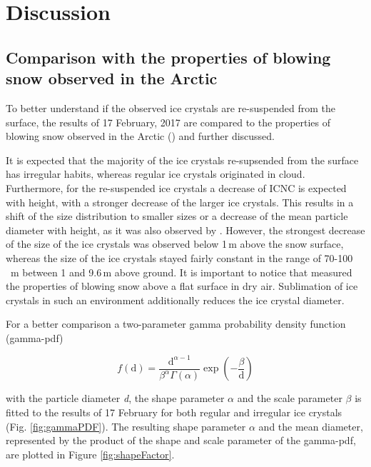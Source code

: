 \documentclass[draft,linenumbers]{agujournal}
\begin{document}
\section{Discussion}
\label{Discussion}

\subsection{Comparison with the properties of blowing snow observed in the Arctic}
\label{Discussion_comp} 
To better understand if the observed ice crystals are re-suspended from the surface, the results of 17 February, 2017 are compared to the properties of blowing snow observed in the Arctic (\citep{Nis05}) and further discussed. 

It is expected that the majority of the ice crystals re-supsended from the surface has irregular habits, whereas regular ice crystals originated in cloud. Furthermore, for the re-suspended ice crystals a decrease of ICNC is expected with height, with a stronger decrease of the larger ice crystals. This results in a shift of the size distribution to smaller sizes or a decrease of the mean particle diameter with height, as it was also observed by \citet{Nis05}. However, the strongest decrease of the size of the ice crystals was observed below 1\,\si{m} above the snow surface, whereas the size of the ice crystals stayed fairly constant in the range of 70-100\,\si{\mu m} between 1 and 9.6\,\si{m} above ground. It is important to notice that \citet{Nis05} measured the properties of blowing snow above a flat surface in dry air. Sublimation of ice crystals in such an environment additionally reduces the ice crystal diameter. 

For a better comparison a two-parameter gamma probability density function (gamma-pdf) \citep{Bud66, Sch82} 

\begin{linenomath*}
\begin{equation}
f(\text{d}) = \frac{\text{d}^{\alpha - 1}}{\beta^{\alpha} \Gamma\left(\alpha\right)}\exp\left(-\frac{\beta}{\text{d}}\right) 
\end{equation}
\end{linenomath*}

with the particle diameter \textit{d}, the shape parameter $\alpha$ and the scale parameter $\beta$ is fitted to the results of 17 February for both regular and irregular ice crystals (Fig. \ref{fig:gammaPDF}). The resulting shape parameter $\alpha$ and the mean diameter, represented by the product of the shape and scale parameter of the gamma-pdf, are plotted in Figure \ref{fig:shapeFactor}. 
\end{document}
